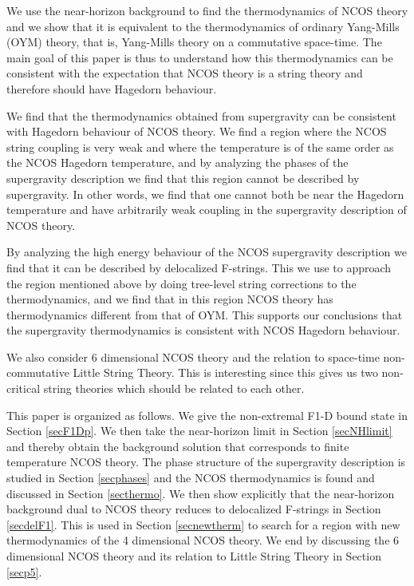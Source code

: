 \documentclass[a4paper,twoside,titlepage,12pt]{article}
\begin{document}
We use the near-horizon background to find the thermodynamics of NCOS theory
and we show that it is equivalent to the thermodynamics of 
ordinary Yang-Mills (OYM) theory, that is, Yang-Mills theory on a commutative
space-time.
The main goal of this paper is thus to understand how this thermodynamics
can be consistent with the expectation that NCOS theory is a string theory
and therefore should have Hagedorn behaviour.

We find that the thermodynamics obtained from supergravity
can be consistent with Hagedorn behaviour of NCOS theory. 
We find a region where the NCOS string coupling is very weak
and where the temperature is of the same order as the 
NCOS Hagedorn temperature, and by analyzing 
the phases of the supergravity description we find that this region 
cannot be described by supergravity. 
In other words, we find that one cannot both be near the Hagedorn 
temperature and have arbitrarily weak coupling 
in the supergravity description of NCOS theory.

By analyzing the high energy behaviour of the NCOS supergravity description
we find that it can be described by delocalized F-strings. 
This we use to approach the region mentioned above by doing tree-level
string corrections to the thermodynamics, and we find that
in this region NCOS theory has thermodynamics different from that of OYM.
This supports our conclusions that the supergravity thermodynamics
is consistent with NCOS Hagedorn behaviour.

We also consider 6 dimensional NCOS theory and the relation 
to space-time non-commutative Little String Theory. 
This is interesting since this gives us two
non-critical string theories which should be related to each other.

This paper is organized as follows. 
We give the 
non-extremal F1-D\coordHE{} bound state in Section \ref{secF1Dp}.
We then take the near-horizon limit in Section \ref{secNHlimit}
and thereby obtain the background solution
that corresponds to finite temperature NCOS theory.
The phase structure of the supergravity description is studied in
Section \ref{secphases} and the NCOS thermodynamics is found and
discussed in Section \ref{secthermo}. 
We then show explicitly that the near-horizon background dual to NCOS theory
reduces to delocalized F-strings in Section \ref{secdelF1}.
This is used in Section \ref{secnewtherm} to search for a region
with new thermodynamics of the 4 dimensional NCOS theory.
We end by discussing the 6 dimensional NCOS theory and its relation to
Little String Theory in Section \ref{secp5}.
\end{document}
